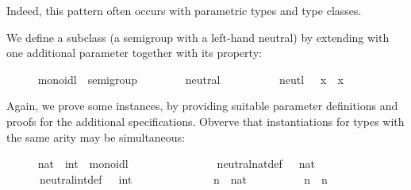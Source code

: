 \begin{isabellebody}
\begin{isamarkuptext}
  Indeed, this pattern often occurs with parametric types
  and type classes.%
\end{isamarkuptext}%
\isamarkuptrue%
%
\isamarkuptrue%
%
\begin{isamarkuptext}%
We define a subclass  (a semigroup with a left-hand neutral)
  by extending 
  with one additional parameter  together
  with its property:%
\end{isamarkuptext}%
\isamarkuptrue%
\ \ \ \ \isamarkupfalse%
\ monoidl\ {\isacharequal}\ semigroup\ {\isacharplus}\isanewline
\ \ \ \ \ \ \ neutral\ {\isacharcolon}{\isacharcolon}\ {\isachardoublequoteopen}{\isasymalpha}{\isachardoublequoteclose}\ {\isacharparenleft}{\isachardoublequoteopen}{\isasymone}{\isachardoublequoteclose}{\isacharparenright}\isanewline
\ \ \ \ \ \ \ neutl{\isacharcolon}\ {\isachardoublequoteopen}{\isasymone}\ {\isasymotimes}\ x\ {\isacharequal}\ x{\isachardoublequoteclose}%
\begin{isamarkuptext}%
\noindent Again, we prove some instances, by
  providing suitable parameter definitions and proofs for the
  additional specifications.  Obverve that instantiations
  for types with the same arity may be simultaneous:%
\end{isamarkuptext}%
\isamarkuptrue%
\ \ \ \ \isamarkupfalse%
\ nat\ \ int\ {\isacharcolon}{\isacharcolon}\ monoidl\isanewline
\ \ \ \ \isanewline
\isanewline
\ \ \ \ \isamarkupfalse%
\isanewline
\ \ \ \ \ \ neutral{\isacharunderscore}nat{\isacharunderscore}def{\isacharcolon}\ {\isachardoublequoteopen}{\isasymone}\ {\isacharequal}\ {\isacharparenleft}{}{\isasymColon}nat{\isacharparenright}{\isachardoublequoteclose}\isanewline
\isanewline
\ \ \ \ \isamarkupfalse%
\isanewline
\ \ \ \ \ \ neutral{\isacharunderscore}int{\isacharunderscore}def{\isacharcolon}\ {\isachardoublequoteopen}{\isasymone}\ {\isacharequal}\ {\isacharparenleft}{}{\isasymColon}int{\isacharparenright}{\isachardoublequoteclose}\isanewline
\isanewline
\ \ \ \ \isamarkupfalse%
%
\isadelimproof
\ %
\endisadelimproof
%
\isatagproof
{}\isamarkupfalse%
\isanewline
\ \ \ \ \ \ \isamarkupfalse%
\ n\ {\isacharcolon}{\isacharcolon}\ nat\isanewline
\ \ \ \ \ \ \isamarkupfalse%
\ {\isachardoublequoteopen}{\isasymone}\ {\isasymotimes}\ n\ {\isacharequal}\ n{\isachardoublequoteclose}\isanewline

\end{isabellebody}
